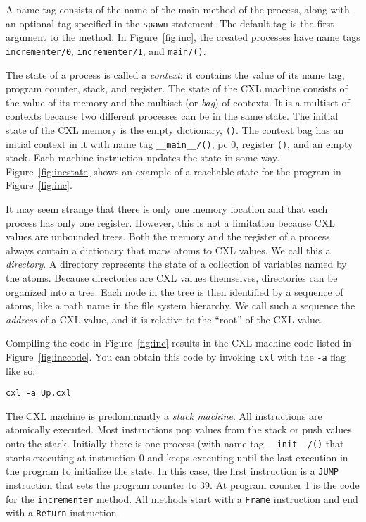 \documentclass{report}
\newenvironment{code}{
\tcolorbox
}{
\endtcolorbox
}
\begin{document}
A name tag consists of the name of the main method of the process,
along with an optional tag specified in the \texttt{spawn} statement.
The default tag is the first argument to the method.
In Figure~\ref{fig:inc}, the created processes have name tags
\texttt{incrementer/0}, \texttt{incrementer/1}, and \texttt{main/()}.

The state of a process is called a \emph{context}: it contains the value of
its name tag, program counter, stack, and register.
The state of the CXL machine
consists of the value of its memory and the multiset (or \emph{bag}) of
contexts.  It is a multiset of contexts because two different processes can
be in the same state.
The initial state of the CXL memory is the empty dictionary, \texttt{()}.
The context bag has an initial context in it with name tag
\texttt{\_\_main\_\_/()}, pc 0, register \texttt{()}, and an empty stack.
Each machine instruction updates the state in some way.
Figure~\ref{fig:incstate} shows an example of a reachable state for 
the program in Figure~\ref{fig:inc}.


It may seem strange that there is only one memory location and that each
process has only one register.  However, this is not a limitation because
CXL values are unbounded trees.
Both the memory and the register of a process always contain
a dictionary that maps atoms to CXL values.  We call this a \emph{directory}.
A directory represents the state of a collection of variables named by the atoms.
%
Because directories are CXL values themselves,
directories can be organized into a tree.
Each node in the tree is then identified
by a sequence of atoms, like a path name in the file system hierarchy.  We call
such a sequence the \emph{address} of a CXL value, and it is relative to the
``root'' of the CXL value.

Compiling the code in Figure~\ref{fig:inc} results in the CXL machine code
listed in Figure~\ref{fig:inccode}.
You can obtain this code by invoking \texttt{cxl} with the \texttt{-a} flag
like so:
\begin{code}
\begin{verbatim}
cxl -a Up.cxl
\end{verbatim}
\end{code}
The CXL machine is predominantly a \emph{stack machine}.
All instructions are atomically executed.
Most instructions pop values from the stack or push values onto the stack.
Initially there is one process (with name tag \texttt{\_\_init\_\_/()}
that starts executing at instruction 0 and keeps executing until the last
execution in the program to initialize the state.
In this case, the first instruction is a \texttt{JUMP} instruction that sets the
program counter to 39.
At program counter 1 is the code for the \texttt{incrementer} method.
All methods start with a \texttt{Frame} instruction and end with a \texttt{Return}
instruction.
\end{document}
